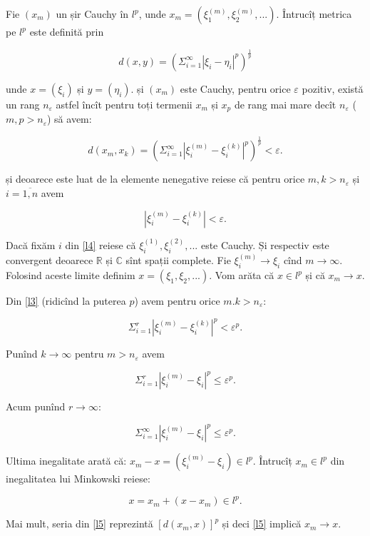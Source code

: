 \documentclass[a4paper,12pt]{article}
\theoremstyle{change}
\newenvironment{proof}{{\bf Demonstrație:} }{}
\begin{document}
\begin{proof}
Fie $(x_m)$ un șir Cauchy în $l^p$, unde $x_m=(\xi_1^{(m)},\xi_2^{(m)},...)$. Întrucîț metrica pe $l^p$ este definită prin

\[
  d(x,y) = (\Sigma_{i=1}^\infty |\xi_i - \eta_i|^p)^{\frac{1}{p}}
\]

unde $x=(\xi_i)$ și $y=(\eta_i)$.  și $(x_m)$ este Cauchy, pentru orice $\varepsilon$ pozitiv, există un rang $n_{\varepsilon}$ astfel încît pentru toți termenii $x_m$ și $x_p$ de rang mai mare decît $n_{\varepsilon}$ ($m,p>n_{\varepsilon}$) să avem:

\[
\label{l3}
d(x_m,x_k) = (\Sigma_{i=1}^\infty |\xi_i^{(m)} - \xi_i^{(k)}|^p)^{\frac{1}{p}} < \varepsilon.
\]

și deoarece este luat de la elemente nenegative reiese că pentru orice $m,k>n_\varepsilon$ și $i=\overline{1,n}$ avem

\[
\label{l4}
|\xi_i^{(m)} - \xi_i^{(k)}| < \varepsilon.
\]

Dacă fixăm $i$ din \ref{l4} reiese că $\xi_i^{(1)},\xi_i^{(2)},...$ este Cauchy. Și respectiv este convergent deoarece $\mathbb{R}$ și $\mathbb{C}$ sînt spații complete. Fie $\xi_i^{(m)}\to \xi_i$ cînd $m\to\infty$. Folosind aceste limite definim $x=(\xi_1, \xi_2,...)$. Vom arăta că $x\in l^p$ și că $x_m\to x$.

Din \ref{l3} (ridicînd la puterea $p$) avem pentru orice $m.k>n_\varepsilon$:

\[
\Sigma_{i=1}^r |\xi_i^{(m)} - \xi_i^{(k)}|^p < \varepsilon^p.
\]

Punînd $k\to\infty$ pentru $m>n_\varepsilon$ avem

\[
\Sigma_{i=1}^r |\xi_i^{(m)} - \xi_i|^p \leq \varepsilon^p.
\]

Acum punînd $r\to\infty$:

\[
\label{l5}
\Sigma_{i=1}^\infty |\xi_i^{(m)} - \xi_i|^p \leq \varepsilon^p.
\]

Ultima inegalitate arată că: $x_m-x=(\xi_i^{(m)}-\xi_i)\in l^p$. Întrucîț $x_m\in l^p$ din inegalitatea lui Minkowski reiese:

\[
x=x_m+(x-x_m)\in l^p.
\]

Mai mult, seria din \ref{l5} reprezintă $[d(x_m,x)]^p$ și deci \ref{l5} implică $x_m\to x$.

\end{proof}



\end{document}

